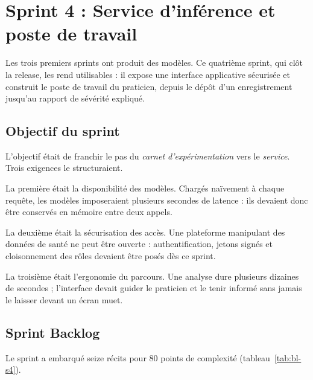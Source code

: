 \section{Sprint 4 : Service d'inférence et poste de travail}
\label{sec:sprint4}

Les trois premiers sprints ont produit des modèles. Ce quatrième sprint, qui clôt la
release, les rend utilisables : il expose une interface applicative sécurisée et construit
le poste de travail du praticien, depuis le dépôt d'un enregistrement jusqu'au rapport de
sévérité expliqué.

\subsection{Objectif du sprint}

L'objectif était de franchir le pas du \emph{carnet d'expérimentation} vers le
\emph{service}. Trois exigences le structuraient.

La première était la disponibilité des modèles. Chargés naïvement à chaque
requête, les modèles imposeraient plusieurs secondes de latence : ils devaient donc être
conservés en mémoire entre deux appels.

La deuxième était la sécurisation des accès. Une plateforme manipulant des
données de santé ne peut être ouverte : authentification, jetons signés et cloisonnement
des rôles devaient être posés dès ce sprint.

La troisième était l'ergonomie du parcours. Une analyse dure plusieurs dizaines
de secondes ; l'interface devait guider le praticien et le tenir informé sans jamais le
laisser devant un écran muet.

\subsection{Sprint Backlog}

Le sprint a embarqué seize récits pour 80 points de complexité
(tableau~\ref{tab:bl-s4}).

